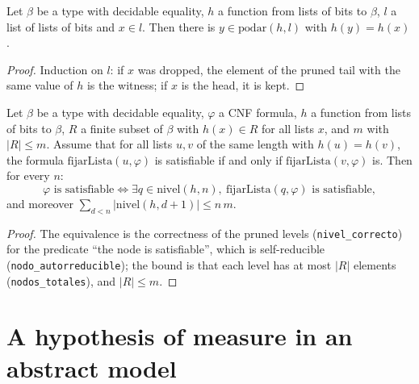 \begin{theorem}
  \label{thm:scales-podar-cubre}
  \leanok
  Let $\beta$ be a type with decidable equality, $h$ a function from lists of bits to $\beta$, $l$ a list
  of lists of bits and $x \in l$. Then there is $y \in \mathrm{podar}(h,l)$ with $h(y) = h(x)$.
  \own{}
\end{theorem}

\begin{proof}
  \leanok
  Induction on $l$: if $x$ was dropped, the element of the pruned tail with the same value of $h$ is the
  witness; if $x$ is the head, it is kept.
\end{proof}

\begin{theorem}
  \label{thm:scales-poda-sat}
  \leanok
  Let $\beta$ be a type with decidable equality, $\varphi$ a CNF formula, $h$ a function from lists of
  bits to $\beta$, $R$ a finite subset of $\beta$ with $h(x) \in R$ for all lists $x$, and $m$ with
  $|R| \le m$. Assume that for all lists $u, v$ of the same length with $h(u) = h(v)$, the formula
  $\mathrm{fijarLista}(u,\varphi)$ is satisfiable if and only if $\mathrm{fijarLista}(v,\varphi)$ is. Then
  for every $n$:
  \[
    \varphi \text{ is satisfiable} \iff \exists q \in \mathrm{nivel}(h,n),\ \mathrm{fijarLista}(q,\varphi)
    \text{ is satisfiable},
  \]
  and moreover $\sum_{d<n} |\mathrm{nivel}(h,d+1)| \le n\,m$.
  \own{}
\end{theorem}

\begin{proof}
  \leanok
  The equivalence is the correctness of the pruned levels (\texttt{nivel\_correcto}) for the predicate
  ``the node is satisfiable'', which is self-reducible (\texttt{nodo\_autorreducible}); the bound is that
  each level has at most $|R|$ elements (\texttt{nodos\_totales}), and $|R| \le m$.
\end{proof}

\section{A hypothesis of measure in an abstract model}
\label{sec:scales-medida}

